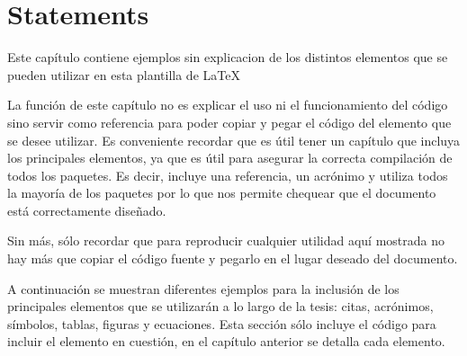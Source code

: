 \chapter{Statements}\label{ch:Statements}
\begin{chapter_resume}
Este capítulo contiene ejemplos sin explicacion de los distintos elementos que se pueden utilizar en esta plantilla de \LaTeX

\vspace{0.7cm}

La función de este capítulo no es explicar el uso ni el funcionamiento del código sino servir como referencia para poder copiar y pegar el código del elemento que se desee utilizar.
Es conveniente recordar que es útil tener un capítulo que incluya los principales elementos, ya que es útil para asegurar la correcta compilación de todos los paquetes. 
Es decir, incluye una referencia, un acrónimo y utiliza todos la mayoría de los paquetes por lo que nos permite chequear que el documento está correctamente diseñado.

\vspace{0.7cm}

Sin más, sólo recordar que para reproducir cualquier utilidad aquí mostrada no hay más que copiar el código fuente y pegarlo en el lugar deseado del documento.
\end{chapter_resume}
A continuación se muestran diferentes ejemplos para la inclusión de los principales elementos que se utilizarán a lo largo de la tesis: citas, acrónimos, símbolos, tablas, figuras y ecuaciones. Esta sección sólo incluye el código para incluir el elemento en cuestión, en el capítulo anterior se detalla cada elemento.

